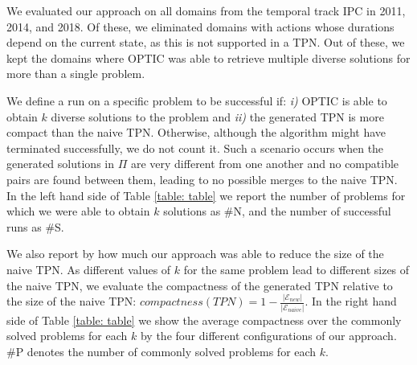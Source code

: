 We evaluated our approach on all domains from the temporal track IPC in 2011, 2014, and 2018. Of these, we eliminated domains with actions whose durations depend on the current state, as this is not supported in a TPN.
Out of these, we kept the domains where OPTIC was able to retrieve multiple diverse solutions for more than a single problem.

We define a run on a specific problem to be successful if: \textit{i)} OPTIC is able to obtain $k$ diverse solutions to the problem and \textit{ii)} the generated TPN is more compact than the naive TPN. Otherwise, although the algorithm might have terminated successfully, we do not count it. Such a scenario occurs when the generated solutions in $\Pi$ are very different from one another and no compatible pairs are found between them, leading to no possible merges to the naive TPN. In the left hand side of Table \ref{table: table} we report the number of problems for which we were able to obtain $k$ solutions as \#N, and the number of successful runs as \#S.

We also report by how much our approach was able to reduce the size of the naive TPN. As different values of $k$ for the same problem lead to different sizes of the naive TPN, we evaluate the compactness of the generated TPN relative to the size of the naive TPN: $compactness(TPN) = 1 - \frac{|\mathcal{E}_{new}|}{|\mathcal{E}_{naive}|}$. In the right hand side of Table \ref{table: table} we show the average compactness over the commonly solved problems for each $k$ by the four different configurations of our approach. \#P denotes the number of commonly solved problems for each $k$.




